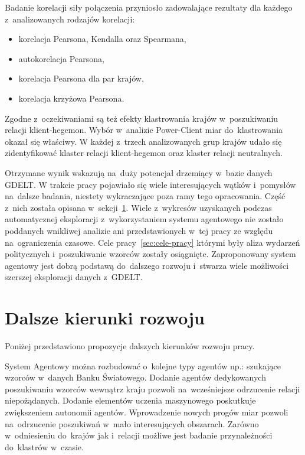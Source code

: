 \documentclass[11pt]{report}
\begin{document}
    Badanie korelacji siły połączenia przyniosło zadowalające rezultaty dla każdego z~analizowanych rodzajów korelacji:
    \begin{itemize}
        \item korelacja Pearsona, Kendalla oraz Spearmana,
        \item autokorelacja Pearsona,
        \item korelacja Pearsona dla par krajów,
        \item korelacja krzyżowa Pearsona.
    \end{itemize}

    Zgodne z~oczekiwaniami są też efekty klastrowania krajów w~poszukiwaniu relacji klient-hegemon.
    Wybór w~analizie Power-Client miar do~klastrowania okazał się właściwy.
    W każdej z~trzech analizowanych grup krajów udało się zidentyfikować klaster relacji klient-hegemon oraz klaster relacji neutralnych.

    Otrzymane wynik wskazują na~duży potencjał drzemiący w~bazie danych GDELT\@.
    W trakcie pracy pojawiało się wiele interesujących wątków i~pomysłów na~dalsze badania, niestety wykraczające poza ramy tego opracowania.
    Część z~nich została opisana w~sekcji~\ref{sec:dalsze-kierunki-rozwoju}.
    Wiele z~wykresów uzyskanych podczas automatycznej eksploracji z~wykorzystaniem systemu agentowego nie zostało poddanych wnikliwej analizie
    ani przedstawionych w~tej pracy ze względu na~ograniczenia czasowe.
    Cele pracy~\ref{sec:cele-pracy} którymi były aliza wydarzeń politycznych i~poszukiwanie wzorców zostały osiągnięte.
    Zaproponowany system agentowy jest dobrą podstawą do~dalszego rozwoju i~stwarza wiele możliwości szerszej eksploracji danych z~GDELT\@.


    \section{Dalsze kierunki rozwoju}\label{sec:dalsze-kierunki-rozwoju}
    Poniżej przedstawiono propozycje dalszych kierunków rozwoju pracy.

    System Agentowy można rozbudować o~kolejne typy agentów np.: szukające wzorców w~danych Banku Światowego.
    Dodanie agentów dedykowanych poszukiwaniu wzorców wewnątrz kraju pozwoli na~wcześniejsze odrzucenie relacji niepożądanych.
    Dodanie elementów uczenia maszynowego poskutkuje zwiększeniem autonomii agentów.
    Wprowadzenie nowych progów miar pozwoli na~odrzucenie poszukiwań w~mało interesujących obszarach.
    Zarówno w~odniesieniu do~krajów jak i~relacji możliwe jest badanie przynależności do~klastrów w~czasie.
\end{document}
